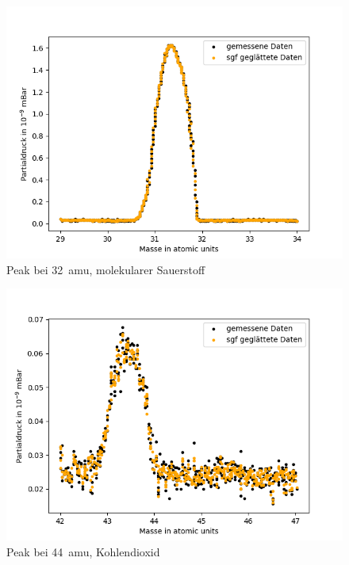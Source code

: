 \begin{figure}[H]
    \centering
    \includegraphics[width=140mm,scale=0.8]{Massenspektrometer/include/MSm32O2.png}
    \caption{Peak bei \SI{32}{amu}, molekularer Sauerstoff}
    \label{fig:MSO2Peak}
\end{figure}
\begin{figure}[H]
    \centering
    \includegraphics[width=140mm,scale=0.8]{Massenspektrometer/include/MSm44CO2.png}
    \caption{Peak bei \SI{44}{amu}, Kohlendioxid}
    \label{fig:MSCO2Peak}
\end{figure}
